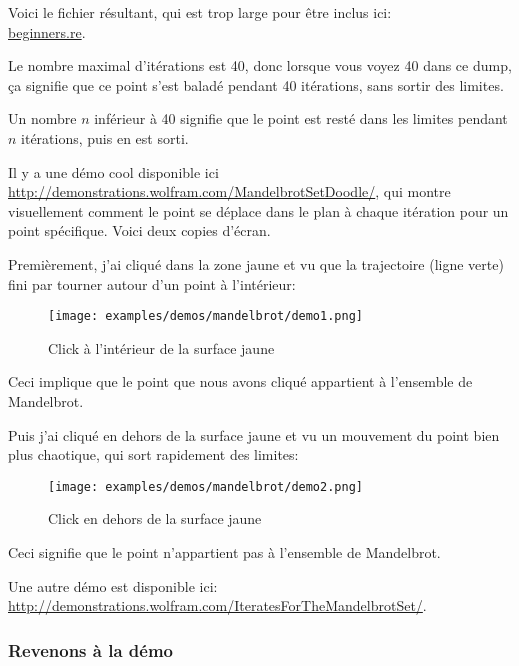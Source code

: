 

Voici le fichier résultant, qui est trop large pour être inclus ici:\\
\href{http://beginners.re/examples/mandelbrot/result.txt}{beginners.re}.

Le nombre maximal d'itérations est 40, donc lorsque vous voyez 40 dans ce dump, ça
signifie que ce point s'est baladé pendant 40 itérations, sans sortir des limites.

Un nombre $n$ inférieur à 40 signifie que le point est resté dans les limites pendant
$n$ itérations, puis en est sorti.

\clearpage
Il y a une démo cool disponible ici \url{http://demonstrations.wolfram.com/MandelbrotSetDoodle/}, qui montre
visuellement comment le point se déplace dans le plan à chaque itération pour un
point spécifique.
Voici deux copies d'écran.

%
Premièrement, j'ai cliqué dans la zone jaune et vu que la trajectoire (ligne verte)
fini par tourner autour d'un point à l'intérieur:

\begin{figure}[H]
\centering
\texttt{[image: examples/demos/mandelbrot/demo1.png]}
\caption{Click à l'intérieur de la surface jaune}
\end{figure}


Ceci implique que le point que nous avons cliqué appartient à l'ensemble de Mandelbrot.

\clearpage

Puis j'ai cliqué en dehors de la surface jaune et vu un mouvement du point bien plus
chaotique, qui sort rapidement des limites:

\begin{figure}[H]
\centering
\texttt{[image: examples/demos/mandelbrot/demo2.png]}
\caption{Click en dehors de la surface jaune}
\end{figure}

Ceci signifie que le point n'appartient pas à l'ensemble de Mandelbrot.

Une autre démo est disponible ici:
\url{http://demonstrations.wolfram.com/IteratesForTheMandelbrotSet/}.

\clearpage
\subsubsection{Revenons à la démo}


